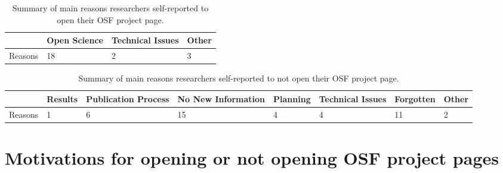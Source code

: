 \documentclass[
  ,jou, a4paper,floatsintext]{apa6}
\begin{document}
\begin{table*}[tbp]

\begin{center}
\begin{threeparttable}

\caption{\label{tab:reasonopen}Summary of main reasons researchers self-reported to open their OSF project page.}

\begin{tabular}{llll}
\toprule
 & \multicolumn{1}{c}{Open Science} & \multicolumn{1}{c}{Technical Issues} & \multicolumn{1}{c}{Other}\\
\midrule
Reasons & 18 & 2 & 3\\
\bottomrule
\end{tabular}

\end{threeparttable}
\end{center}

\end{table*}

\begin{table*}[tbp]

\begin{center}
\begin{threeparttable}

\caption{\label{tab:reasonclosed}Summary of main reasons researchers self-reported to not open their OSF project page.}

\begin{tabular}{llllllll}
\toprule
 & \multicolumn{1}{c}{Results} & \multicolumn{1}{c}{Publication Process} & \multicolumn{1}{c}{No New Information} & \multicolumn{1}{c}{Planning} & \multicolumn{1}{c}{Technical Issues} & \multicolumn{1}{c}{Forgotten} & \multicolumn{1}{c}{Other}\\
\midrule
Reasons & 1 & 6 & 15 & 4 & 4 & 11 & 2\\
\bottomrule
\end{tabular}

\end{threeparttable}
\end{center}

\end{table*}

\newpage

\hypertarget{motivations-for-opening-or-not-opening-osf-project-pages}{%
\section{Motivations for opening or not opening OSF project pages}\label{motivations-for-opening-or-not-opening-osf-project-pages}}
\end{document}
